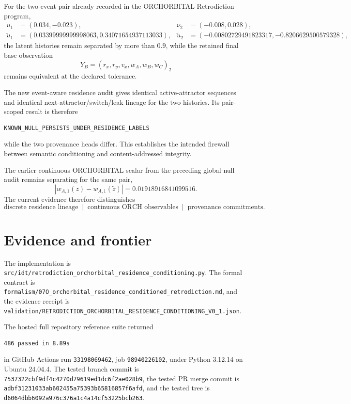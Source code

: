 For the two-event pair already recorded in the ORCHORBITAL Retrodiction program,
\[
\begin{aligned}
u_1&=(0.034,-0.023), &
\nu_2&=(-0.008,0.028),\\
\widetilde u_1&=(0.03399999999998063,0.34071654937113033), &
\widetilde u_2&=(-0.00802729491823317,-0.8206629500579328),
\end{aligned}
\]
the latent histories remain separated by more than \(0.9\), while the retained final base observation
\[
Y_B=(r_x,r_y,v_x,w_A,w_B,w_C)_2
\]
remains equivalent at the declared tolerance.

The new event-aware residence audit gives identical active-attractor sequences and identical next-attractor/switch/leak lineage for the two histories. Its pair-scoped result is therefore
\begin{verbatim}
KNOWN_NULL_PERSISTS_UNDER_RESIDENCE_LABELS
\end{verbatim}
while the two provenance heads differ. This establishes the intended firewall between semantic conditioning and content-addressed integrity.

The earlier continuous ORCHORBITAL scalar from the preceding global-null audit remains separating for the same pair,
\[
\boxed{
|w_{A,1}(z)-w_{A,1}(\widetilde z)|
=0.01918916841099516.
}
\]
The current evidence therefore distinguishes
\[
\boxed{
\text{discrete residence lineage}
\;\mid\;
\text{continuous ORCH observables}
\;\mid\;
\text{provenance commitments}.
}
\]

\section{Evidence and frontier}

The implementation is \texttt{src/idt/retrodiction\_orchorbital\_residence\_conditioning.py}. The formal contract is \texttt{formalism/07O\_orchorbital\_residence\_conditioned\_retrodiction.md}, and the evidence receipt is \texttt{validation/RETRODICTION\_ORCHORBITAL\_RESIDENCE\_CONDITIONING\_V0\_1.json}.

The hosted full repository reference suite returned
\begin{verbatim}
486 passed in 8.89s
\end{verbatim}
in GitHub Actions run \texttt{33198069462}, job \texttt{98940226102}, under Python 3.12.14 on Ubuntu 24.04.4. The tested branch commit is \texttt{7537322cbf9df4c4270d79619ed1dc6f2ae028b9}, the tested PR merge commit is \texttt{adbf31231033ab602455a75393b65816857f6afd}, and the tested tree is \texttt{d6064dbb6092a976c376a1c4a14cf53225bcb263}.

